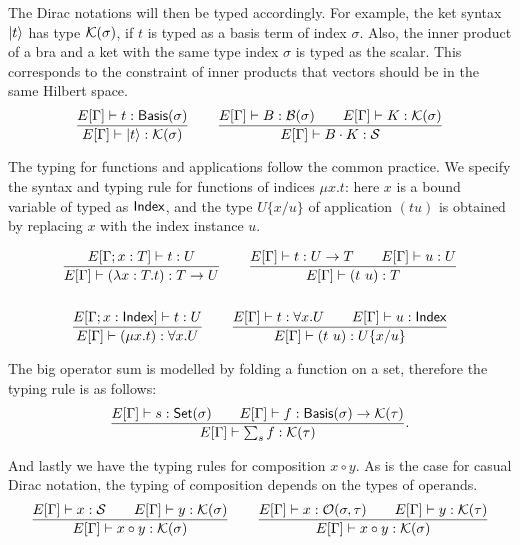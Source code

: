 \documentclass[runningheads]{llncs}
\begin{document}
The Dirac notations will then be typed accordingly. For example, the ket syntax $\ket{t}$ has type $\mathcal{K}(\sigma)$, if $t$ is typed as a basis term of index $\sigma$. Also, the inner product of a bra and a ket with the same type index $\sigma$ is typed as the scalar. This corresponds to the constraint of inner products that vectors should be in the same Hilbert space.
\begin{gather*}
    \frac{E[\Gamma]\vdash t : \mathsf{Basis}(\sigma)}{E[\Gamma] \vdash \ket{t} : \mathcal{K}(\sigma)}
    \qquad
    \frac{E[\Gamma]\vdash B : \mathcal{B}(\sigma) \qquad E[\Gamma]\vdash K : \mathcal{K}(\sigma)}{E[\Gamma] \vdash B \cdot K : \mathcal{S}}
\end{gather*}

The typing for functions and applications follow the common practice. We specify the syntax and typing rule for functions of indices $\mu x. t$: here $x$ is a bound variable of typed as $\mathsf{Index}$, and the type $U\{x/u\}$ of application $(t u)$ is obtained by replacing $x$ with the index instance $u$.


\begin{gather*}
    \frac{E[\Gamma; x : T] \vdash t : U}{E[\Gamma] \vdash (\lambda x : T . t) : T \to U}
    \qquad
    \frac{E[\Gamma] \vdash t:U \to T \qquad E[\Gamma] \vdash u:U}{E[\Gamma] \vdash (t\ u):T} \\
    \\
    \frac{E[\Gamma; x : \mathsf{Index}] \vdash t : U}{E[\Gamma] \vdash (\mu x.t) : \forall x.U}
    \qquad
    \frac{E[\Gamma] \vdash t:\forall x.U \qquad E[\Gamma] \vdash u : \mathsf{Index}}{E[\Gamma] \vdash (t\ u):U\{x/u\}}
\end{gather*}


The big operator sum is modelled by folding a function on a set, therefore the typing rule is as follows:
\[
    \frac{E[\Gamma] \vdash s : \mathsf{Set}(\sigma) \qquad E[\Gamma] \vdash f : \mathsf{Basis}(\sigma) \to \mathcal{K}(\tau)}{E[\Gamma] \vdash \sum_{s} f : \mathcal{K}(\tau)}.
\]

And lastly we have the typing rules for composition $x \circ y$. As is the case for casual Dirac notation, the typing of composition depends on the types of operands.
\begin{gather*}
    \frac{E[\Gamma] \vdash x : \mathcal{S} \qquad E[\Gamma] \vdash y : \mathcal{K}(\sigma)}{E[\Gamma] \vdash x \circ y : \mathcal{K}(\sigma)}
    \qquad
    \frac{E[\Gamma] \vdash x : \mathcal{O}(\sigma, \tau) \qquad E[\Gamma] \vdash y : \mathcal{K}(\tau)}{E[\Gamma] \vdash x \circ y : \mathcal{K}(\sigma)}
\end{gather*}
\end{document}
